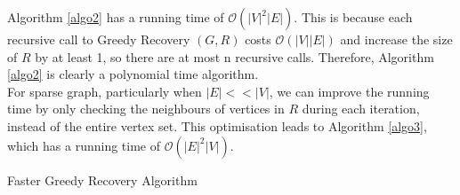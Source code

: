 Algorithm \ref{algo2} has a running time of $\mathcal{O}(|V|^2|E|).$ This is because each recursive call to Greedy Recovery $(G, R)$ costs $\mathcal{O}(|V||E|)$ and increase the size of $R$ by at least 1, so there are at most n recursive calls. Therefore, Algorithm \ref{algo2} is clearly a polynomial time algorithm. \\
For sparse graph, particularly when $|E|<<|V|$, we can improve the running time by only checking the neighbours of vertices in $R$ during each iteration, instead of the entire vertex set. This optimisation leads to Algorithm \ref{algo3}, which has a running time of $\mathcal{O}(|E|^2|V|).$\\
\begin{algorithm}[H]\label{algo3}
\caption{Faster Greedy Recovery Algorithm}
\DontPrintSemicolon %
\BlankLine
\end{algorithm}

